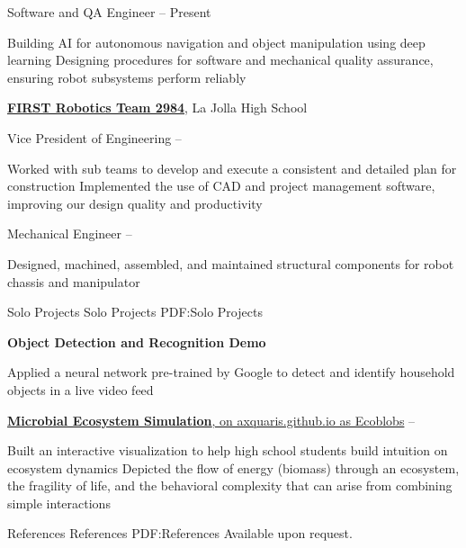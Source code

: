 \documentclass[letterpaper,MMMyyyy,nonstopmode]{simpleresumecv}
\begin{document}
\begin{Body}
\Gap
\BulletItem
Software and QA Engineer
\hfill
{} --
Present
\begin{Detail}
\SubBulletItem
Building AI for autonomous navigation and object manipulation using deep learning
\SubBulletItem
Designing procedures for software and mechanical quality assurance, ensuring robot subsystems perform reliably 
\end{Detail}

\BigGap
\BigGap
\Entry
\href{https://frcteam2984.github.io/}
{\textbf{FIRST Robotics Team 2984}},
La Jolla High School

\Gap
\BulletItem
Vice President of Engineering
\hfill
{} --
\begin{Detail}
\SubBulletItem
Worked with sub teams to develop and execute a consistent and detailed plan for construction
\SubBulletItem
Implemented the use of CAD and project management software, improving our design quality and productivity
\end{Detail}

\Gap
\BulletItem
Mechanical Engineer
\hfill
{} --
\begin{Detail}
\SubBulletItem
Designed, machined, assembled, and maintained structural components for robot chassis and manipulator
\end{Detail}


\Section
{Solo Projects}
{Solo Projects}
{PDF:Solo Projects}

\Entry
\textbf{Object Detection and Recognition Demo}
\hfill
{}
\Gap
\begin{Detail}
\SubBulletItem
Applied a neural network pre-trained by Google to detect and identify household objects in a live video feed 
\end{Detail}

\BigGap
\BigGap
\Entry
\href{http://axquaris.github.io/}
{\textbf{Microbial Ecosystem Simulation}, on axquaris.github.io as Ecoblobs}
\hfill
{} --

\Gap
\begin{Detail}
\SubBulletItem
Built an interactive visualization to help high school students build intuition on ecosystem dynamics
\SubBulletItem
Depicted the flow of energy (biomass) through an ecosystem, the fragility of life, and the behavioral complexity that can arise from combining simple interactions
\end{Detail}

\Section
{References}
{References}
{PDF:References}
\Entry
Available upon request.

\end{Body}
\thispagestyle{empty} %
\end{document}

